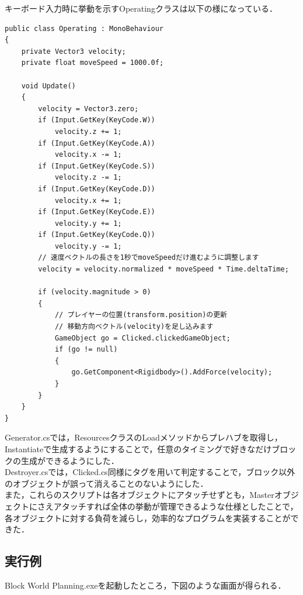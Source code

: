 \documentclass[12pt]{jarticle}
\begin{document}
キーボード入力時に挙動を示すOperatingクラスは以下の様になっている．

\begin{lstlisting}[caption=Operatingクラス, label=operating]
public class Operating : MonoBehaviour
{
    private Vector3 velocity;
    private float moveSpeed = 1000.0f;

    void Update()
    {
        velocity = Vector3.zero;
        if (Input.GetKey(KeyCode.W))
            velocity.z += 1;
        if (Input.GetKey(KeyCode.A))
            velocity.x -= 1;
        if (Input.GetKey(KeyCode.S))
            velocity.z -= 1;
        if (Input.GetKey(KeyCode.D))
            velocity.x += 1;
        if (Input.GetKey(KeyCode.E))
            velocity.y += 1;
        if (Input.GetKey(KeyCode.Q))
            velocity.y -= 1;
        // 速度ベクトルの長さを1秒でmoveSpeedだけ進むように調整します
        velocity = velocity.normalized * moveSpeed * Time.deltaTime;

        if (velocity.magnitude > 0)
        {
            // プレイヤーの位置(transform.position)の更新
            // 移動方向ベクトル(velocity)を足し込みます
            GameObject go = Clicked.clickedGameObject;
            if (go != null)
            {
                go.GetComponent<Rigidbody>().AddForce(velocity);
            }
        }
    }
}
\end{lstlisting}

Generator.csでは，ResourcesクラスのLoadメソッドからプレハブを取得し，Instantiateで生成するようにすることで，任意のタイミングで好きなだけブロックの生成ができるようにした． \\

Destroyer.csでは，Clicked.cs同様にタグを用いて判定することで，ブロック以外のオブジェクトが誤って消えることのないようにした． \\

また，これらのスクリプトは各オブジェクトにアタッチせずとも，Masterオブジェクトにさえアタッチすれば全体の挙動が管理できるような仕様としたことで，各オブジェクトに対する負荷を減らし，効率的なプログラムを実装することができた．

\clearpage

\subsection{実行例}
Block World Planning.exeを起動したところ，下図のような画面が得られる．
\end{document}
